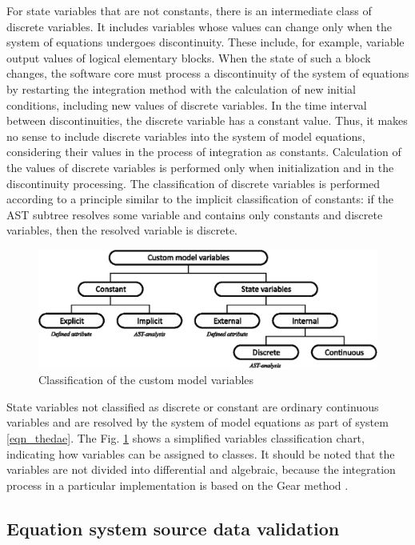 \documentclass[lettersize,journal]{IEEEtran}
\begin{document}
For state variables that are not constants, there is an intermediate class of discrete variables. It includes variables whose 
values can change only when the system of equations undergoes discontinuity. These include, for example, variable output values of
logical elementary blocks. When the state of such a block changes, the software core must process a
discontinuity of the system of equations by restarting the integration method with the calculation of new initial conditions,
including new values of discrete variables. In the time interval between discontinuities, the discrete variable has a constant
value. Thus, it makes no sense to include discrete variables into the system of model equations, considering their values in the
process of integration as constants. Calculation of the values of discrete variables is performed only when initialization and in
the discontinuity processing. The classification of discrete variables is performed according to a principle similar 
to the implicit classification of constants: if the AST subtree resolves some variable and contains only constants and discrete
variables, then the resolved variable is discrete.

\begin{figure}[h]
	\centering
	\includegraphics[width=\columnwidth]{variables.eps}
	\caption{Classification of the custom model variables}
	\label{fig_vars}
\end{figure}

State variables not classified as discrete or constant are ordinary continuous variables and are resolved by the system of model
equations as part of system \eqref{eqn_thedae}. The Fig. \ref{fig_vars} shows a simplified variables classification chart,
indicating how variables can be assigned to classes. 
It should be noted that the variables are not divided into differential and algebraic, because the 
integration process in a particular implementation is based on the Gear method \cite{gear71}.

\subsection {Equation system source data validation} \label{sec_validation}
\end{document}
